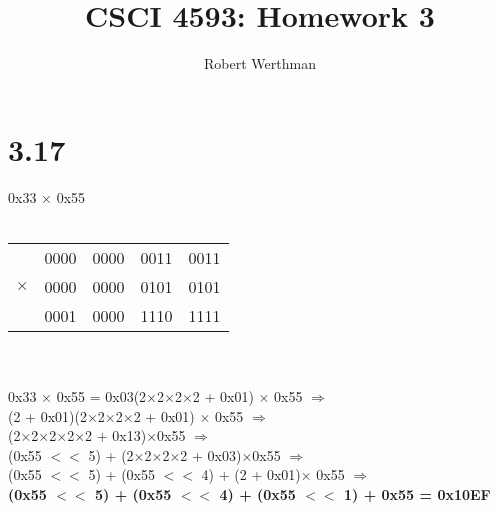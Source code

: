 \documentclass[12pt]{article}
\begin{document}
	
\title{CSCI 4593: Homework 3}
\author{Robert Werthman}
\date{}

\maketitle

\section*{3.17}
0x33 $\times$ 0x55\\
\\
\begin{tabular}{ccccc}
	& 0000 & 0000 & 0011 & 0011\\
	$\times$ & 0000 & 0000 & 0101 & 0101\\
	\hline
	& 0001 & 0000 & 1110 & 1111\\
\end{tabular}
\\
\\
0x33 $\times$ 0x55 = 0x03(2$\times$2$\times$2$\times$2 + 0x01) $\times$ 0x55  $\Rightarrow$\\
(2 + 0x01)(2$\times$2$\times$2$\times$2 + 0x01) $\times$ 0x55 $\Rightarrow$\\
(2$\times$2$\times$2$\times$2$\times$2 + 0x13)$\times$0x55 $\Rightarrow$\\
(0x55 $<<$ 5) + (2$\times$2$\times$2$\times$2 + 0x03)$\times$0x55 $\Rightarrow$\\
(0x55 $<<$ 5) + (0x55 $<<$ 4) + (2 + 0x01)$\times$ 0x55 $\Rightarrow$\\ 
\textbf{(0x55 $<<$ 5) + (0x55 $<<$ 4) + (0x55 $<<$ 1) + 0x55 = 0x10EF}
\end{document}
